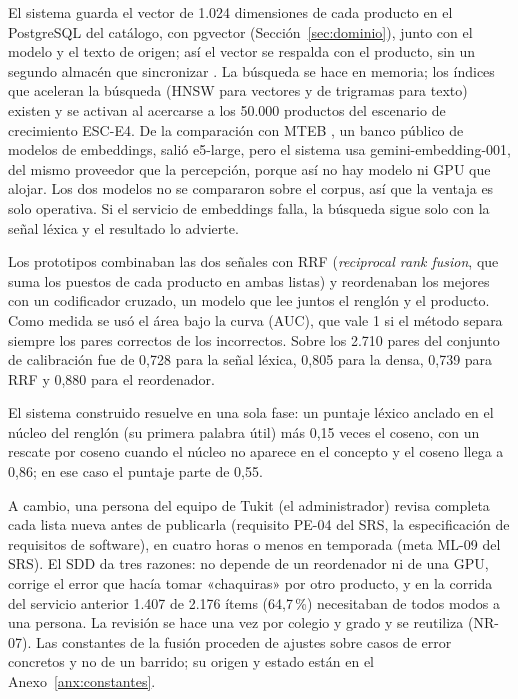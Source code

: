 El sistema guarda el vector de 1.024 dimensiones de cada producto en el PostgreSQL del catálogo, con
pgvector (Sección~\ref{sec:dominio}), junto con el modelo y el texto de origen; así el vector se
respalda con el producto, sin un segundo almacén que sincronizar \citep{kleppmann_designing_2017}.
La búsqueda se hace en memoria; los índices que aceleran la búsqueda (HNSW para vectores y de trigramas para texto) existen y se
activan al acercarse a los 50.000 productos del escenario de crecimiento ESC-E4. De la comparación con MTEB \citep{muennighoff_mteb_2023}, un banco público de modelos de embeddings,
salió e5-large, pero el sistema usa gemini-embedding-001, del mismo proveedor que la percepción,
porque así no hay modelo ni GPU que alojar. Los dos modelos no se compararon sobre el corpus, así que
la ventaja es solo operativa. Si el servicio de embeddings falla, la búsqueda sigue solo con la señal
léxica y el resultado lo advierte.

Los prototipos combinaban las dos señales con RRF (\emph{reciprocal rank fusion}, que suma los puestos
de cada producto en ambas listas) y reordenaban los mejores con un codificador cruzado, un modelo que
lee juntos el renglón y el producto. Como medida se usó el área bajo la curva (AUC), que vale 1 si el
método separa siempre los pares correctos de los incorrectos. Sobre los 2.710 pares del conjunto de
calibración fue de 0,728 para la señal léxica,
0,805 para la densa, 0,739 para RRF y 0,880 para el reordenador.

El sistema construido resuelve en
una sola fase: un puntaje léxico anclado en el núcleo del renglón (su primera palabra útil) más 0,15 veces el
coseno, con un rescate por coseno cuando el núcleo no aparece en el concepto y el coseno llega a 0,86;
en ese caso el puntaje parte de 0,55.

A cambio, una persona del equipo de Tukit (el administrador)
revisa completa cada lista nueva antes de publicarla (requisito PE-04 del SRS, la especificación de
requisitos de software), en cuatro horas o menos en temporada (meta ML-09 del SRS). El SDD da tres razones: no depende de un reordenador ni de una GPU, corrige el error que
hacía tomar «chaquiras» por otro producto, y en la corrida del servicio anterior 1.407 de 2.176 ítems
(64,7\,\%) necesitaban de todos modos a una persona. La revisión se hace una vez por colegio y grado
y se reutiliza (NR-07). Las constantes de la fusión proceden de ajustes sobre casos de error concretos
y no de un barrido; su origen y estado están en el Anexo~\ref{anx:constantes}.

